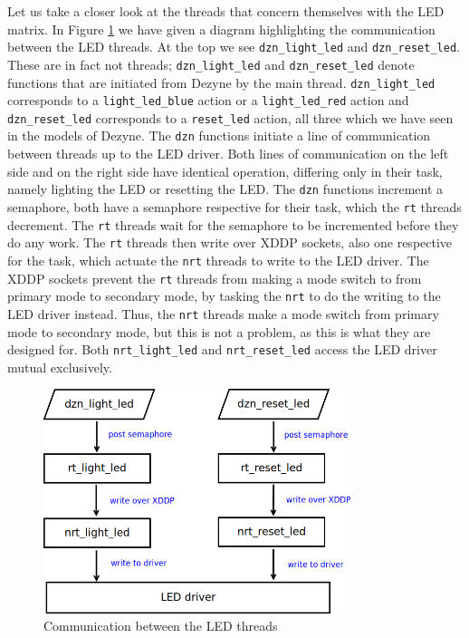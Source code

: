 \documentclass[12pt]{scrreprt}
\begin{document}
Let us take a closer look at the threads that concern themselves with the LED matrix. In Figure \ref{fig:led_threads} we have given a diagram highlighting the communication between the LED threads. At the top we see \texttt{dzn\_light\_led} and \texttt{dzn\_reset\_led}. These are in fact not threads; \texttt{dzn\_light\_led} and \texttt{dzn\_reset\_led} denote functions that are initiated from Dezyne by the main thread. \texttt{dzn\_light\_led} corresponds to a \texttt{light\_led\_blue} action or a \texttt{light\_led\_red} action and \texttt{dzn\_reset\_led} corresponds to a \texttt{reset\_led} action, all three which we have seen in the models of Dezyne. The \texttt{dzn} functions initiate a line of communication between threads up to the LED driver. Both lines of communication on the left side and on the right side have identical operation, differing only in their task, namely lighting the LED or resetting the LED. The \texttt{dzn} functions increment a semaphore, both have a semaphore respective for their task, which the \texttt{rt} threads decrement. The \texttt{rt} threads wait for the semaphore to be incremented before they do any work. The \texttt{rt} threads then write over XDDP sockets, also one respective for the task, which actuate the \texttt{nrt} threads to write to the LED driver. The XDDP sockets prevent the \texttt{rt} threads from making a mode switch to from primary mode to secondary mode, by tasking the \texttt{nrt} to do the writing to the LED driver instead. Thus, the \texttt{nrt} threads make a mode switch from primary mode to secondary mode, but this is not a problem, as this is what they are designed for. Both \texttt{nrt\_light\_led} and \texttt{nrt\_reset\_led} access the LED driver mutual exclusively.

\begin{figure}[H]
    \centering
    \includegraphics[width=0.8\textwidth]{Figures/results/modelling_figures/Threading/LED_threads.png}
    \caption{Communication between the LED threads}
    \label{fig:led_threads}
\end{figure}
\end{document}

